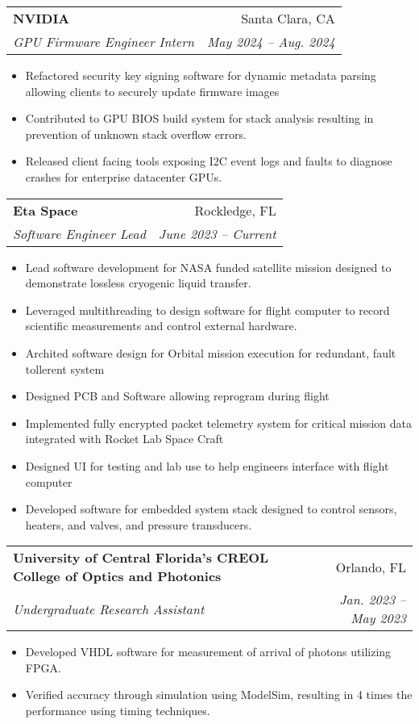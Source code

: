 \documentclass[letterpaper,10pt]{article}
\makeatletter
\newcommand{\resumeSubheading}[4]{
  \item\vspace{1pt}
    \begin{tabular*}{0.97\textwidth}[t]{l@{\extracolsep{\fill}}r}
      \textbf{#1} & #2 \\
      \textit{\small#3} & \textit{\small #4} \\
    \end{tabular*}\vspace{-2pt}
}
\newcommand{\resumeItemListStart}{\begin{itemize}[font=\footnotesize, itemsep=2pt, topsep=2pt]}
\newcommand{\resumeItemListEnd}{\end{itemize}\vspace{-6pt}}
\makeatother
\begin{document}
    \resumeSubheading
      {NVIDIA}{Santa Clara, CA}
      {GPU Firmware Engineer Intern}{May 2024 -- Aug. 2024}
      \resumeItemListStart
        \item{Refactored security key signing software for dynamic metadata parsing allowing clients to securely update firmware images}
        \item{Contributed to GPU BIOS build system for stack analysis resulting in prevention of unknown stack overflow errors.}
        \item{Released client facing tools exposing I2C event logs and faults to diagnose crashes for enterprise datacenter GPUs.}
      \resumeItemListEnd

    \resumeSubheading
      {Eta Space}{Rockledge, FL}
      {Software Engineer Lead}{June 2023 -- Current}
      \resumeItemListStart
        \item{Lead software development for NASA funded satellite mission designed to demonstrate lossless cryogenic liquid transfer.}
        \item{Leveraged multithreading to design software for flight computer to record scientific measurements and control external hardware.}
        \item{Archited software design for Orbital mission execution for redundant, fault tollerent system}
        \item{Designed PCB and Software allowing reprogram during flight }
        \item{Implemented fully encrypted packet telemetry system for critical mission data integrated with Rocket Lab Space Craft}
        \item{Designed UI for testing and lab use to help engineers interface with flight computer}
        \item{Developed software for embedded system stack designed to control sensors, heaters, and valves, and pressure transducers.}
      \resumeItemListEnd

    \resumeSubheading
      {University of Central Florida's CREOL College of Optics and Photonics}{Orlando, FL}
      {Undergraduate Research Assistant}{Jan. 2023 -- May 2023}
      \resumeItemListStart
        \item{Developed VHDL software for measurement of arrival of photons utilizing FPGA.}
        \item{Verified accuracy through simulation using ModelSim, resulting in 4 times the performance using timing techniques.}
      \resumeItemListEnd
\end{document}

